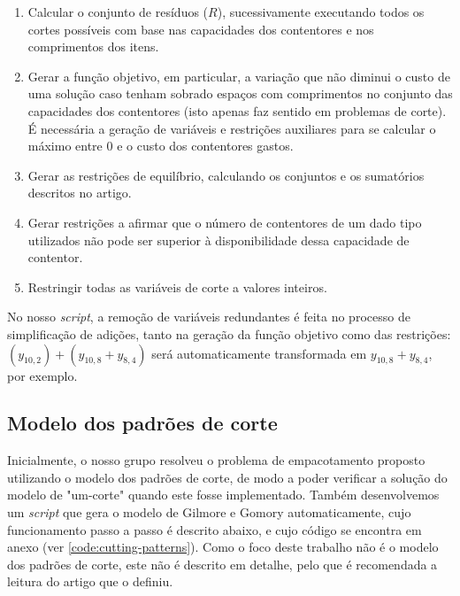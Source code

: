 \documentclass[12pt, a4paper, titlepage]{article}
\begin{document}
\begin{enumerate}
    \item Calcular o conjunto de resíduos ($R$), sucessivamente executando todos os cortes possíveis
        com base nas capacidades dos contentores e nos comprimentos dos itens.

    \item Gerar a função objetivo, em particular, a variação que não diminui o custo de uma solução
        caso tenham sobrado espaços com comprimentos no conjunto das capacidades dos contentores
        (isto apenas faz sentido em problemas de corte). É necessária a geração de variáveis e
        restrições auxiliares para se calcular o máximo entre $0$ e o custo dos contentores gastos.

    \item Gerar as restrições de equilíbrio, calculando os conjuntos e os sumatórios descritos no
        artigo.

    \item Gerar restrições a afirmar que o número de contentores de um dado tipo utilizados não pode
        ser superior à disponibilidade dessa capacidade de contentor.

    \item Restringir todas as variáveis de corte a valores inteiros.
\end{enumerate}

No nosso \emph{script}, a remoção de variáveis redundantes é feita no processo de simplificação de
adições, tanto na geração da função objetivo como das restrições:
$(y_{10, 2}) + (y_{10, 8} + y_{8, 4})$ será automaticamente transformada em $y_{10, 8} + y_{8, 4}$,
por exemplo.

\subsection{Modelo dos padrões de corte}

Inicialmente, o nosso grupo resolveu o problema de empacotamento proposto utilizando o modelo dos
padrões de corte, de modo a poder verificar a solução do modelo de "um-corte"{} quando este fosse
implementado. Também desenvolvemos um \emph{script} que gera o modelo de Gilmore e Gomory
automaticamente, cujo funcionamento passo a passo é descrito abaixo, e cujo código se encontra em
anexo (ver \ref{code:cutting-patterns}). Como o foco deste trabalho não é o modelo dos padrões de
corte, este não é descrito em detalhe, pelo que é recomendada a leitura do artigo que o definiu.
\cite{gilmore-and-gomory}
\end{document}
